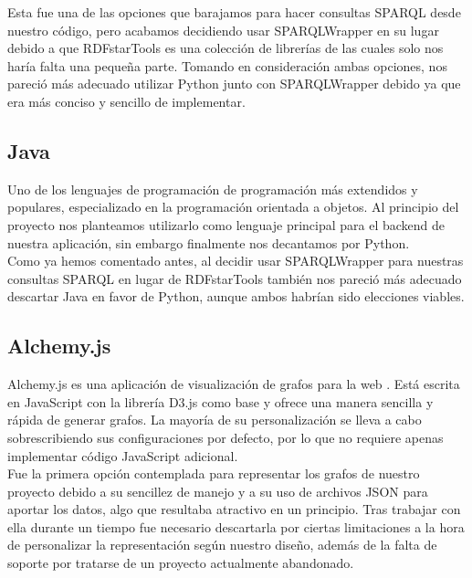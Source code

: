 Esta fue una de las opciones que barajamos para hacer consultas SPARQL desde nuestro código, pero acabamos decidiendo usar SPARQLWrapper en su lugar debido a que RDFstarTools es una colección de librerías de las cuales solo nos haría falta una pequeña parte. Tomando en consideración ambas opciones, nos pareció más adecuado utilizar Python junto con SPARQLWrapper debido ya que era más conciso y sencillo de implementar.

\subsection*{Java}

Uno de los lenguajes de programación de programación más extendidos y populares, especializado en la programación orientada a objetos. Al principio del proyecto nos planteamos utilizarlo como lenguaje principal para el backend de nuestra aplicación, sin embargo finalmente nos decantamos por Python.\\

Como ya hemos comentado antes, al decidir usar SPARQLWrapper para nuestras consultas SPARQL en lugar de RDFstarTools también nos pareció más adecuado descartar Java en favor de Python, aunque ambos habrían sido elecciones viables. 

\subsection*{Alchemy.js}

Alchemy.js es una aplicación de visualización de grafos para la web \cite{alchemyjs}. Está escrita en JavaScript con la librería D3.js como base y ofrece una manera sencilla y rápida de generar grafos. La mayoría de su personalización se lleva a cabo sobrescribiendo sus configuraciones por defecto, por lo que no requiere apenas implementar código JavaScript adicional.\\

Fue la primera opción contemplada para representar los grafos de nuestro proyecto debido a su sencillez de manejo y a su uso de archivos JSON para aportar los datos, algo que resultaba atractivo en un principio. Tras trabajar con ella durante un tiempo fue necesario descartarla por ciertas limitaciones a la hora de personalizar la representación según nuestro diseño, además de la falta de soporte por tratarse de un proyecto actualmente abandonado.
